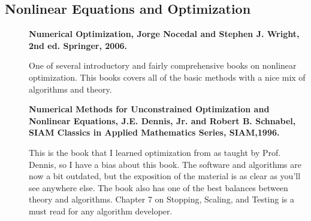 \documentclass[11pt]{article}
\begin{document}
\subsection{Nonlinear Equations and Optimization}
\begin{description}

\item[] {\bf Numerical Optimization, Jorge Nocedal and Stephen J. Wright, 2nd ed. Springer, 2006.}  

One of several introductory and fairly comprehensive books on nonlinear optimization. This books covers all of the basic methods with a nice mix of algorithms and theory.

\item[] {\bf Numerical Methods for Unconstrained Optimization and Nonlinear Equations, J.E. Dennis, Jr. and Robert B. Schnabel, SIAM Classics in Applied Mathematics Series, SIAM,1996.}  

This is the book that I learned optimization from as taught by Prof. Dennis, so I have a bias about this book.  The software and algorithms are now a bit outdated, but the exposition of the material is as clear as you'll see anywhere else.  The book also has one of the best balances between theory and algorithms.   Chapter 7 on Stopping, Scaling, and Testing is a must read for any algorithm developer.

\end{description}
\end{document}
